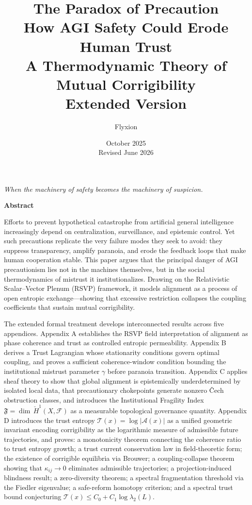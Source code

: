 \documentclass[11pt,a4paper]{article}
\title{\Huge\textbf{The Paradox of Precaution}\\
       \vspace{0.3em}
       \Large How AGI Safety Could Erode Human Trust\\
       \vspace{0.3em}
       \normalsize A Thermodynamic Theory of Mutual Corrigibility\\
       \vspace{0.3em}
       \small Extended Version}
\author{Flyxion}
\date{October 2025 \\ \small Revised June 2026}
\theoremstyle{definition}
\theoremstyle{plain}
\begin{document}
\maketitle

\vspace{-0.5em}

\begin{center}
\textit{When the machinery of safety becomes the machinery of suspicion.}
\end{center}

\vspace{0.5em}

\begin{center}
\textbf{Abstract}
\end{center}

Efforts to prevent hypothetical catastrophe from artificial general intelligence increasingly depend on centralization, surveillance, and epistemic control.
Yet such precautions replicate the very failure modes they seek to avoid: they suppress transparency, amplify paranoia, and erode the feedback loops that make human cooperation stable.
This paper argues that the principal danger of AGI precautionism lies not in the machines themselves, but in the social thermodynamics of mistrust it institutionalizes.
Drawing on the Relativistic Scalar--Vector Plenum (RSVP) framework, it models alignment as a process of open entropic exchange---showing that excessive restriction collapses the coupling coefficients that sustain mutual corrigibility.

The extended formal treatment develops interconnected results across five appendices.
Appendix A establishes the RSVP field interpretation of alignment as phase coherence and trust as controlled entropic permeability.
Appendix B derives a Trust Lagrangian whose stationarity conditions govern optimal coupling, and proves a sufficient coherence-window condition bounding the institutional mistrust parameter $\gamma$ before paranoia transition.
Appendix C applies sheaf theory to show that global alignment is epistemically underdetermined by isolated local data, that precautionary chokepoints generate nonzero \v{C}ech obstruction classes, and introduces the Institutional Fragility Index $\mathfrak{F} = \dim\,\check{H}^1(X,\mathcal{F})$ as a measurable topological governance quantity.
Appendix D introduces the trust entropy $\mathcal{T}(x) = \log|\mathcal{A}(x)|$ as a unified geometric invariant encoding corrigibility as the logarithmic measure of admissible future trajectories, and proves: a monotonicity theorem connecting the coherence ratio to trust entropy growth; a trust current conservation law in field-theoretic form; the existence of corrigible equilibria via Brouwer; a coupling-collapse theorem showing that $\kappa_{ij} \to 0$ eliminates admissible trajectories; a projection-induced blindness result; a zero-diversity theorem; a spectral fragmentation threshold via the Fiedler eigenvalue; a safe-reform homotopy criterion; and a spectral trust bound conjecturing $\mathcal{T}(x) \leq C_0 + C_1\log\lambda_2(L)$.
\end{document}
